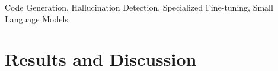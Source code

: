 \documentclass{sbc2019}
\begin{document}
\begin{frontmatter}
\begin{abstract}

\end{abstract}

\begin{keywords}
Code Generation, Hallucination Detection, Specialized Fine-tuning, Small Language Models
\end{keywords}
\end{frontmatter}






\section{Results and Discussion}
\label{sec:results}












\end{document}
